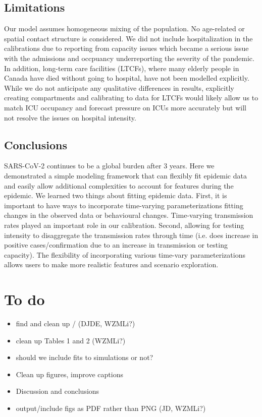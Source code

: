 \documentclass[12pt]{article}\usepackage[]{graphicx}\usepackage[]{color}
\begin{document}
\subsection{Limitations}

Our model assumes homogeneous mixing of the population. 
No age-related or spatial contact structure is considered. 
We did not include hospitalization in the calibrations due to reporting from capacity issues which became a serious issue with the admissions and occpuancy underreporting the severity of the pandemic.
In addition, long-term care facilities (LTCFs), where many elderly people in Canada have died without going to hospital, have not been modelled explicitly.  
While we do not anticipate any qualitative differences in results, explicitly creating compartments and calibrating to data for LTCFs would likely allow us to match ICU occupancy and forecast
pressure on ICUs more accurately but will not resolve the issues on hospital intensity. 

\subsection{Conclusions}

SARS-CoV-2 continues to be a global burden after 3 years. 
Here we demonstrated a simple modeling framework that can flexibly fit epidemic data and easily allow additional complexities to account for features during the epidemic. 
We learned two things about fitting epidemic data. 
First, it is important to have ways to incorporate time-varying parameterizations fitting changes in the observed data or behavioural changes. Time-varying transmission rates played an important role in our calibration. 
Second, allowing for testing intensity to disaggregate the transmission rates through time (i.e. does increase in positive cases/confirmation due to an increase in transmission or testing capacity). 
The flexibility of incorporating various time-vary parameterizations allows users to make more realistic features and scenario exploration. 


\clearpage

\section{To do}

\begin{itemize}
\item find and clean up / (DJDE, WZMLi?)
\item clean up Tables 1 and 2 (WZMLi?)
\item should we include fits to simulations or not?
\item Clean up figures, improve captions  
\item Discussion and conclusions
\item output/include figs as PDF rather than PNG (JD, WZMLi?)
\end{itemize}
\end{document}
